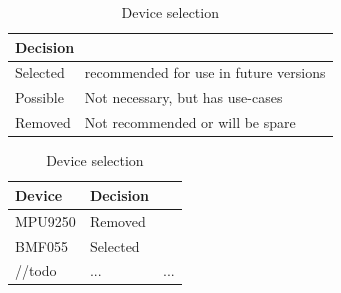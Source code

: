 \begin{table}[H]
\centering
\caption{Device selection}
\label{deviceSelectionTable}
\begin{tabular}{|l|l|}
	\hline
	\multicolumn{2}{|l|}{Decision} \\ \hline
	Selected & recommended for use in future versions \\ \hline
	Possible & Not necessary, but has use-cases \\ \hline
	Removed & Not recommended or will be spare \\ \hline
\end{tabular}
\begin{tabular}{|l|l|l|}
	\hline
	Device & Decision \\ \hline
	MPU9250 & Removed \\ \hline
	BMF055 & Selected \\ \hline
	//todo & ... & ... \\ \hline
\end{tabular}
\end{table}

